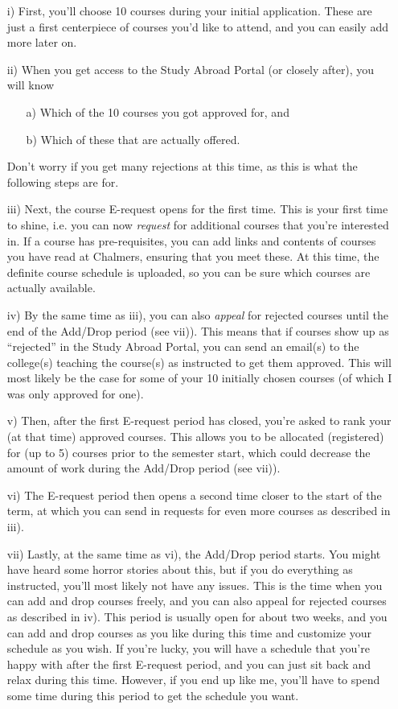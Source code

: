 \begin{enumerate}
    \item[i)] First, you'll choose 10 courses during your initial application. These are just a first centerpiece of courses you'd like to attend, and you can easily add more later on.
    \item[ii)] When you get access to the Study Abroad Portal (or closely after), you will know 
    \begin{enumerate}
        \item[a)] Which of the 10 courses you got approved for, and
        \item[b)] Which of these that are actually offered.
    \end{enumerate}
    Don't worry if you get many rejections at this time, as this is what the following steps are for.
    \item[iii)] Next, the course E-request opens for the first time. This is your first time to shine, i.e. you can now \textit{request} for additional courses that you're interested in. If a course has pre-requisites, you can add links and contents of courses you have read at Chalmers, ensuring that you meet these. At this time, the definite course schedule is uploaded, so you can be sure which courses are actually available.
    \item[iv)] By the same time as iii), you can also \textit{appeal} for rejected courses until the end of the Add/Drop period (see vii)). This means that if courses show up as ``rejected'' in the Study Abroad Portal, you can send an email(s) to the college(s) teaching the course(s) as instructed to get them approved. This will most likely be the case for some of your 10 initially chosen courses (of which I was only approved for one).
    \item[v)] Then, after the first E-request period has closed, you're asked to rank your (at that time) approved courses. This allows you to be allocated (registered) for (up to 5) courses prior to the semester start, which could decrease the amount of work during the Add/Drop period (see vii)).
    \item[vi)] The E-request period then opens a second time closer to the start of the term, at which you can send in requests for even more courses as described in iii). 
    \item[vii)] Lastly, at the same time as vi), the Add/Drop period starts. You might have heard some horror stories about this, but if you do everything as instructed, you'll most likely not have any issues. This is the time when you can add and drop courses freely, and you can also appeal for rejected courses as described in iv). This period is usually open for about two weeks, and you can add and drop courses as you like during this time and customize your schedule as you wish. If you're lucky, you will have a schedule that you're happy with after the first E-request period, and you can just sit back and relax during this time. However, if you end up like me, you'll have to spend some time during this period to get the schedule you want.
\end{enumerate}
